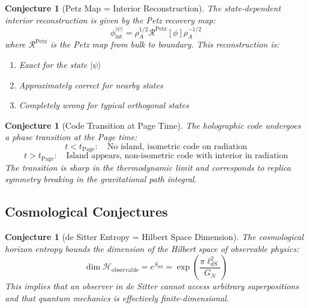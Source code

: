 \documentclass[12pt,a4paper]{article}
\newtheorem{conjecture}[theorem]{Conjecture}
\begin{document}
\begin{conjecture}[Petz Map = Interior Reconstruction]
The state-dependent interior reconstruction is given by the Petz recovery map:
\begin{equation}
\phi_{\text{int}}^{|\psi\rangle} = \rho_{A}^{1/2} \mathcal{R}^{\text{Petz}}[\phi] \rho_A^{-1/2}
\end{equation}
where $\mathcal{R}^{\text{Petz}}$ is the Petz map from bulk to boundary. This reconstruction is:
\begin{enumerate}
    \item Exact for the state $|\psi\rangle$
    \item Approximately correct for nearby states
    \item Completely wrong for typical orthogonal states
\end{enumerate}
\end{conjecture}

\begin{conjecture}[Code Transition at Page Time]
The holographic code undergoes a phase transition at the Page time:
\begin{equation}
t < t_{\text{Page}}: \quad \text{No island, isometric code on radiation}
\end{equation}
\begin{equation}
t > t_{\text{Page}}: \quad \text{Island appears, non-isometric code with interior in radiation}
\end{equation}
The transition is sharp in the thermodynamic limit and corresponds to replica symmetry breaking in the gravitational path integral.
\end{conjecture}

\subsection{Cosmological Conjectures}

\begin{conjecture}[de Sitter Entropy = Hilbert Space Dimension]
The cosmological horizon entropy bounds the dimension of the Hilbert space of observable physics:
\begin{equation}
\dim \mathcal{H}_{\text{observable}} = e^{S_{dS}} = \exp\left( \frac{\pi \ell_{dS}^2}{G_N} \right)
\end{equation}
This implies that an observer in de Sitter cannot access arbitrary superpositions and that quantum mechanics is effectively finite-dimensional.
\end{conjecture}
\end{document}
